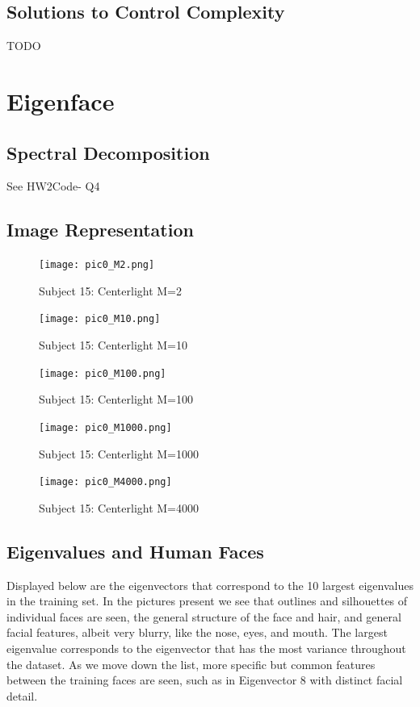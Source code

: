 \documentclass{article}
\begin{document}
\subsection{Solutions to Control Complexity}
TODO

\newpage
\section{Eigenface}
\subsection{Spectral Decomposition}

See HW2Code- Q4

\subsection{Image Representation}

\begin{figure}[!htb]
   \begin{minipage}{0.48\textwidth}
     \centering
      \texttt{[image: pic0\_M2.png]}
    \caption{Subject 15: Centerlight M=2}
   \end{minipage}\hfill
   \begin{minipage}{0.48\textwidth}
     \centering
     \texttt{[image: pic0\_M10.png]}
     \caption{Subject 15: Centerlight M=10}
   \end{minipage}
   \begin{minipage}{0.48\textwidth}
     \centering
     \texttt{[image: pic0\_M100.png]}
     \caption{Subject 15: Centerlight M=100}
   \end{minipage}
   \begin{minipage}{0.48\textwidth}
     \centering
     \texttt{[image: pic0\_M1000.png]}
     \caption{Subject 15: Centerlight M=1000}
   \end{minipage}
   \begin{minipage}{0.48\textwidth}
     \centering
     \texttt{[image: pic0\_M4000.png]}
     \caption{Subject 15: Centerlight M=4000}
   \end{minipage}
\end{figure}

\subsection{Eigenvalues and Human Faces}

Displayed below are the eigenvectors that correspond to the 10 largest eigenvalues in the training set. In the pictures present we see that outlines and silhouettes of individual faces are seen, the general structure of the face and hair, and general facial features, albeit very blurry, like the nose, eyes, and mouth. The largest eigenvalue corresponds to the eigenvector that has the most variance throughout the dataset. As we move down the list, more specific but common features between the training faces are seen, such as in Eigenvector 8 with distinct facial detail.
\end{document}
